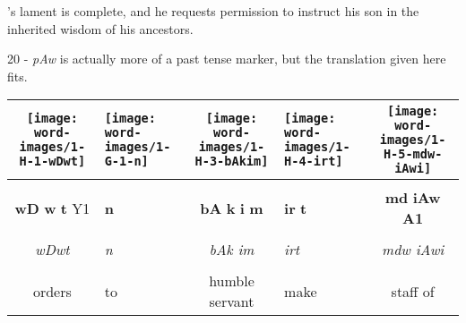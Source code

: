 's lament is complete, and he requests permission to instruct his son in the inherited wisdom of his ancestors.

\vspace*{\fill}

20 - \textit{pAw} is actually more of a past tense marker, but the translation given here fits.

\vspace*{\fill}

\pagebreak


\vspace*{\fill}

\begin{tabularx}{\linewidth}{cYcYc}
	\texttt{[image: word-images/1-H-1-wDwt]} &
	\hspace*{-3mm}\texttt{[image: word-images/1-G-1-n]} &
	\texttt{[image: word-images/1-H-3-bAkim]} &
	\hspace*{-4mm} \texttt{[image: word-images/1-H-4-irt]} &
	\texttt{[image: word-images/1-H-5-mdw-iAwi]} \\
	\hline \\ 
	\textbf{wD} \textbf{w} \textbf{t} Y1 &
	\textbf{n} &
	\textbf{bA} \textbf{k} \textbf{i} \textbf{m} &
	\textbf{ir} \textbf{t} &
	\textbf{md} \textbf{iAw} \textbf{A1} \\
	\hline \\ 
	\textit{wDwt} & \textit{n} & \textit{bAk im} & \textit{irt} & \textit{mdw iAwi} \\
	\hline \\ 
	orders & to & humble servant & \hspace*{-4mm}make & staff of 
\end{tabularx}

\vspace{7.5mm}

